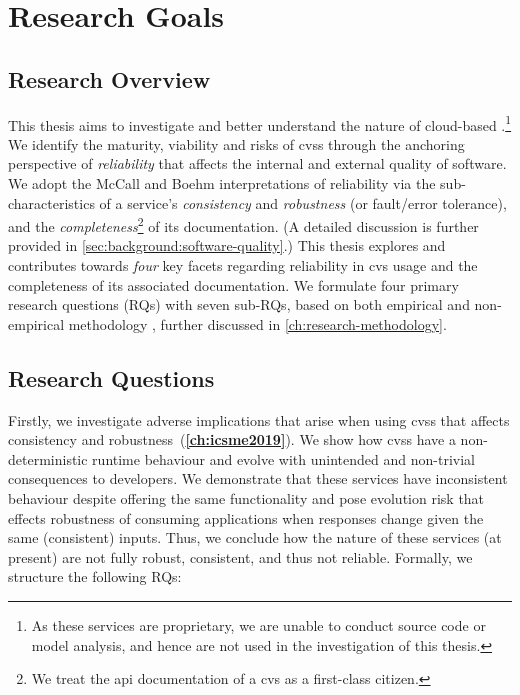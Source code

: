 \section{Research Goals}
\label{sec:introduction:hypohtesis}

\subsection{Research Overview}


This thesis aims to investigate and better understand the nature of cloud-based .\footnote{As these services are proprietary, we are unable to conduct source code or model analysis, and hence are not used in the investigation of this thesis.}
We identify the maturity, viability and risks of \glspl{cvs} through the anchoring perspective of \textit{reliability} that affects the internal and external quality of software. We adopt the McCall \citep{McCall:1977uy} and Boehm \citep{Boehm:1978vv} interpretations of reliability via the sub-characteristics of a service's \textit{consistency} and \textit{robustness} (or fault/error tolerance), and the \textit{completeness}\footnote{We treat the \gls{api} documentation of a \gls{cvs} as a first-class citizen.} of its documentation. (A detailed discussion is further provided in \cref{sec:background:software-quality}.)
This thesis explores and contributes towards \textit{four} key facets regarding reliability in \gls{cvs} usage and the completeness of its associated documentation. We formulate four primary research questions (RQs) with seven sub-RQs, based on both empirical and non-empirical  methodology \citep{Simon:1996uw}, further discussed in \cref{ch:research-methodology}.

\subsection{Research Questions}

Firstly, we investigate adverse implications that arise when using \glspl{cvs} that affects consistency and robustness~(\textbf{\cref{ch:icsme2019}}). We show how \glspl{cvs} have a non-deterministic runtime behaviour and evolve with unintended and non-trivial consequences to developers. We demonstrate that these services have inconsistent behaviour despite offering the same functionality and pose evolution risk that effects robustness of consuming applications when responses change given the same (consistent) inputs. Thus, we conclude how the nature of these services (at present) are not fully robust, consistent, and thus not reliable. Formally, we structure the following RQs:

